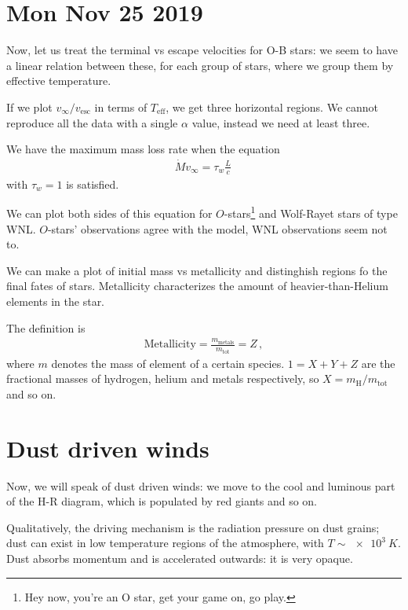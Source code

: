 \documentclass[main.tex]{subfiles}
\begin{document}
\section*{Mon Nov 25 2019}

Now, let us treat the terminal vs escape velocities for O-B stars: we seem to have a linear relation between these,  for each group of stars, where we group them by effective temperature. 

If we plot \(v_{ \infty }/ v _{\text{esc}}\) in terms of \(T _{\text{eff}}\), we get three horizontal regions. 
We cannot reproduce all the data with a single \(\alpha \) value, instead we need at least three. 

We have the maximum mass loss rate when the equation 
%
\begin{align}
  \dot{M} v_{ \infty } = \tau_{w} \frac{L}{c}   
\,
\end{align}
%
with \(\tau_{w} = 1\) is satisfied. 

We can plot both sides of this equation for \(O\)-stars\footnote{Hey now, you're an O star, get your game on, go play.} and Wolf-Rayet stars of type WNL.
\(O\)-stars' observations agree with the model, WNL observations seem not to. 

We can make a plot of initial mass vs metallicity and distinghish regions fo the final fates of stars. 
Metallicity characterizes the amount of heavier-than-Helium elements in the star. 

The definition is 
%
\begin{align}
  \text{Metallicity} = \frac{m_{\text{metals}}}{m_{\text{tot}}} = Z
\,,
\end{align}
%
where \(m\) denotes the mass of element of a certain species. \(1 = X + Y + Z\) are the fractional masses of hydrogen, helium and metals respectively, so \(X = m _{\text{H}}/ m _{\text{tot}}\) and so on. 

\section{Dust driven winds}

Now, we will speak of dust driven winds: we move to the cool and luminous part of the H-R diagram, which is populated by red giants and so on. 

Qualitatively, the driving mechanism is the radiation pressure on dust grains; dust can exist in low temperature regions of the atmosphere, with \(T \sim \SI{e3}{K}\). 
Dust absorbs momentum and is accelerated outwards: it is very opaque. 
\end{document}
